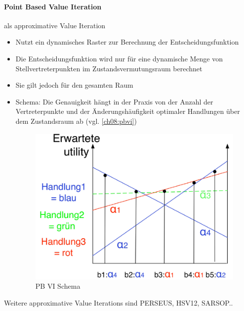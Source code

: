 \paragraph{Point Based Value Iteration} als approximative Value Iteration
\begin{itemize}
	\item Nutzt ein dynamisches Raster zur Berechnung der Entscheidungsfunktion
	\item Die Entscheidungsfunktion wird nur f\"ur eine dynamische Menge von Stellvertreterpunkten im Zustandsvermutungsraum berechnet
	\item Sie gilt jedoch f\"ur den gesamten Raum
	\item Schema: Die Genauigkeit h\"angt in der Praxis von der Anzahl der Vertreterpunkte und der \"Anderungsh\"aufigkeit optimaler Handlungen \"uber dem Zustandsraum ab (vgl. \autoref{ch08:pbvi})
	\begin{figure}[!h]
			\centering
  			\includegraphics[width=0.4\linewidth]{figures/ch08_pbvi.png}
  			\centering
			\caption{PB VI Schema}
			\label{ch08:pbvi}
	\end{figure}
\end{itemize}
Weitere approximative Value Iterations sind PERSEUS, HSV12, SARSOP..

